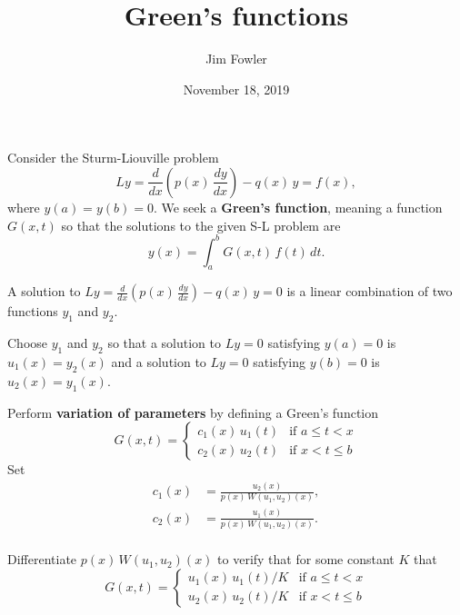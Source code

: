\documentclass{homework}
\author{Jim Fowler}
\title{Green's functions}
\date{November 18, 2019}
\begin{document}
\maketitle

Consider the Sturm-Liouville problem
\[
  Ly = \frac{d}{dx} \left( p(x) \, \frac{dy}{dx} \right) - q(x) \, y = f(x),
\]
where $y(a) = y(b) = 0$.  We seek a \textbf{Green's function}, meaning a function $G(x,t)$ so that the solutions to the given S-L problem are
\[
  y(x) = \int_a^b G(x,t) \, f(t) \, dt.
\]

\begin{problem}
  A solution to $Ly = \frac{d}{dx} \left( p(x) \, \frac{dy}{dx} \right) - q(x) \, y = 0$
  is a linear combination of two functions $y_1$ and $y_2$.
\end{problem}

\vfill

\begin{problem}
  Choose $y_1$ and $y_2$ so that
  a solution to $Ly = 0$ satisfying $y(a) = 0$ is \(u_1(x) = y_2(x)\) and a solution to $Ly = 0$ satisfying $y(b) = 0$ is $u_2(x) = y_1(x)$.
\end{problem}

\vfill

\begin{problem}
  Perform \textbf{variation of parameters} by 
  defining a Green's function
  \[
    G(x,t) = \begin{cases}
      c_1(x) \, u_1(t) & \mbox{if } a \leq t < x \\
      c_2(x) \, u_2(t) & \mbox{if } x < t \leq b
      \end{cases}
    \]
    Set \begin{align*}
          c_1(x) &= \frac{u_2(x)}{p(x) \, W(u_1,u_2)(x)}, \\
          c_2(x) &= \frac{u_1(x)}{p(x) \, W(u_1,u_2)(x)}. \\          
        \end{align*}
        
\end{problem}

\vfill

\begin{problem}
  Differentiate $p(x) \, W(u_1,u_2)(x)$ to verify that for some constant $K$ that
  \[
    G(x,t) = \begin{cases}
      u_1(x) \, u_1(t) / K & \mbox{if } a \leq t < x \\
      u_2(x) \, u_2(t) / K & \mbox{if } x < t \leq b
      \end{cases}
    \]
\end{problem}
\end{document}
